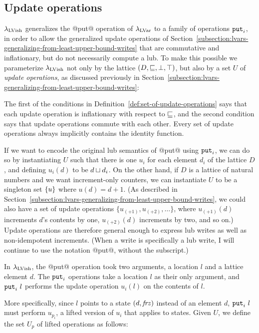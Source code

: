 \subsection{Update operations}\label{subsection:quasi-update-operations}

$\lambda_{\textrm{LVish}}$ generalizes the @put@ operation of $\lambda_{\textrm{LVar}}$ to a
family of operations $\mbox{\texttt{put}}_i$, in order to allow the generalized update
operations of
Section~\ref{subsection:lvars-generalizing-from-least-upper-bound-writes}
that are commutative and inflationary, but do not necessarily compute
a lub.  To make this possible we parameterize $\lambda_{\textrm{LVish}}$ not only
by the lattice $(D, \sqsubseteq, \bot, \top)$, but also by a set $U$ of
\emph{update operations}, as discussed previously in
Section~\ref{subsection:lvars-generalizing-from-least-upper-bound-writes}:

\DefSetOfUpdateOperations

The first of the conditions in
Definition~\ref{def:set-of-update-operations} says that each update
operation is inflationary with respect to $\sqsubseteq$, and the second
condition says that update operations commute with each other.  Every
set of update operations always implicitly contains the identity
function.

If we want to encode the original lub semantics of @put@ using
$\mbox{\texttt{put}}_i$, we can do so by instantiating $U$ such that there is one
$u_i$ for each element $d_i$ of the lattice $D$, and defining $u_i(d)$
to be $d \sqcup d_i$.  On the other hand, if $D$ is a lattice of
natural numbers and we want increment-only counters, we can
instantiate $U$ to be a singleton set $\left\{ u \right\}$ where $u(d) = d +
1$.  (As described in
Section~\ref{subsection:lvars-generalizing-from-least-upper-bound-writes},
we could also have a set of update operations $\{ u_{(+1)}, u_{(+2)},
\dots \}$, where $u_{(+1)}(d)$ increments $d$'s contents by one,
$u_{(+2)}(d)$ increments by two, and so on.) Update operations are
therefore general enough to express lub writes as well as
non-idempotent increments.  (When a write is specifically a lub write,
I will continue to use the notation @put@, without the subscript.)

In $\lambda_{\textrm{LVish}}$, the @put@ operation took two arguments, a location
$l$ and a lattice element $d$.  The $\mbox{\texttt{put}}_i$ operations take a location
$l$ as their only argument, and $\mbox{\texttt{put}}_i~l$ performs the update
operation $u_i(l)$ on the contents of $l$.

More specifically, since $l$ points to a state $(d, \mathit{frz})$
instead of an element $d$, $\mbox{\texttt{put}}_i~l$ must perform $u_{p_i}$, a
lifted version of $u_i$ that applies to states.  Given $U$, we define
the set $U_p$ of lifted operations as follows:


